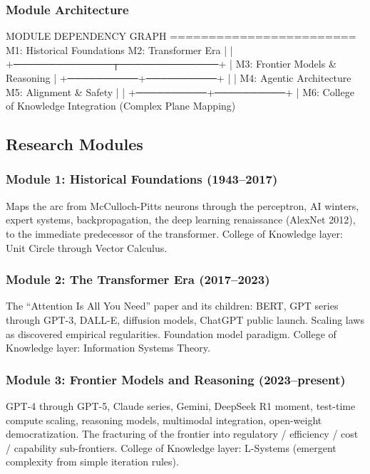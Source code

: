 \documentclass[11pt,letterpaper]{article}
\begin{document}
\subsubsection{Module Architecture}

\begin{asciibox}
   MODULE DEPENDENCY GRAPH
   ========================
   M1: Historical Foundations    M2: Transformer Era
       |                             |
       +──────────────┬──────────────+
                      |
              M3: Frontier Models & Reasoning
                      |
           +──────────+──────────+
           |                     |
   M4: Agentic Architecture   M5: Alignment & Safety
           |                     |
           +──────────+──────────+
                      |
         M6: College of Knowledge Integration
             (Complex Plane Mapping)
\end{asciibox}

\subsection{Research Modules}

\subsubsection{Module 1: Historical Foundations (1943--2017)}
Maps the arc from McCulloch-Pitts neurons through the perceptron, AI winters, expert systems, backpropagation, the deep learning renaissance (AlexNet 2012), to the immediate predecessor of the transformer. College of Knowledge layer: Unit Circle through Vector Calculus.

\subsubsection{Module 2: The Transformer Era (2017--2023)}
The ``Attention Is All You Need'' paper and its children: BERT, GPT series through GPT-3, DALL-E, diffusion models, ChatGPT public launch. Scaling laws as discovered empirical regularities. Foundation model paradigm. College of Knowledge layer: Information Systems Theory.

\subsubsection{Module 3: Frontier Models and Reasoning (2023--present)}
GPT-4 through GPT-5, Claude series, Gemini, DeepSeek R1 moment, test-time compute scaling, reasoning models, multimodal integration, open-weight democratization. The fracturing of the frontier into regulatory / efficiency / cost / capability sub-frontiers. College of Knowledge layer: L-Systems (emergent complexity from simple iteration rules).
\end{document}
